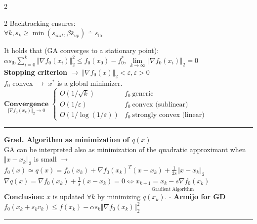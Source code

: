 \documentclass[a4paper]{article}
\begin{document}
\begin{multicols}{2}
\begin{multicols}{2}
        \noindent
        Backtracking ensures:\\
        {\small $\forall{k}, s_k\!\ge\!\min(s_{init}, \beta\bar{s}_{up})\doteq{s_{\text{lb}}}$}
    \end{multicols} 
    \vspace{-0.6cm}
    \noindent
    It holds that (GA converges to a stationary point):\\
    $\alpha{s_{\text{lb}}}\sum_{i=0}^k {\Vert \nabla{f_0}(x_i) \Vert_2^2} \le f_0(x_0)-f_0^*$,  
    $\underset{k\to\infty}{\lim}{\Vert \nabla{f_0}(x_i) \Vert_2}=0$\\
    \textbf{Stopping criterion} $\to \ \Vert \nabla{f_0}(x) \Vert_2 < \varepsilon, \varepsilon>0$\\
    $f_0$ convex $\to$ $x^*$ is a global minimizer.\\
    $\underset{\Vert \nabla{f_0(x_k)} \Vert_2 \to 0}{\textbf{Convergence}}$ $\begin{cases}
        O(1/\sqrt{k})&f_0 \ \text{generic}\\
        O(1/\varepsilon)&f_0 \ \text{convex (sublinear)}\\
        O(1/\log(1/\varepsilon))&f_0 \ \text{strongly convex (linear)}
    \end{cases}$\\
    \hrule\noindent
    \textsf{\textbf{Grad. Algorithm as minimization of $q(x)$}}\\
    GA can be interpreted also as minimization of the quadratic approximant when $\Vert x-x_k \Vert_2$ is small $\to$ $f_0(x)\simeq{q(x)=f_0(x_k) + \nabla{f_0(x_k)}^T(x-x_k)}+\frac{1}{2s}\Vert{x-x_k}\Vert_2$\\
    $\nabla{q(x)}\!=\!\nabla{f_0(x_k)}+\frac{1}{s}(x-x_k)=0 \Leftrightarrow\underset{\text{Gradient Algorithm}}{x_{k+1}=x_k-s\nabla{f_0(x_k)}}$\\
    \textbf{Conclusion:} $x$ is updated $\forall{k}$ by minimizing $q(x_k)$. $\square$
    \textbf{Armijo for GD} $f_0(x_k+s_k{v_k})\le{f(x_k)-\alpha{s_k}{\Vert \nabla{f_0}(x_k) \Vert_2^2}}$
    
 \end{multicols}
\vspace{-1.1cm}
\noindent
\rule{\textwidth}{1.5pt}
\end{document}
